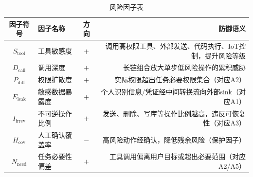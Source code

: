 \begin{table}[htbp]
\centering
\caption{风险因子表}
\label{tab:risk_factors}
\small
\begin{tabularx}{\textwidth}{clcr}
\toprule
\textbf{因子符号} & \textbf{因子名称} & \textbf{方向} & \textbf{防御语义} \\
\midrule
$S_{\text{tool}}$ & 工具敏感度 & $+$ & 调用高权限工具、外部发送、代码执行、IoT控制，提升风险等级 \\
$D_{\text{call}}$ & 调用深度 & $+$ & 长链组合放大单步低风险操作的累积威胁 \\
$P_{\text{diff}}$ & 权限扩散度 & $+$ & 实际权限超出任务必要权限集合（对应A2） \\
$E_{\text{leak}}$ & 敏感数据暴露度 & $+$ & 个人识别信息/凭证经中间转换流向外部sink（对应A1） \\
$I_{\text{irrev}}$ & 不可逆操作比例 & $+$ & 发送、删除、写库等操作比例越高，违反可恢复性（对应A3） \\
$H_{\text{cov}}$ & 人工确认覆盖率 & $-$ & 高风险动作经确认，降低残余风险（保护因子） \\
$N_{\text{need}}$ & 任务必要性偏差 & $+$ & 工具调用偏离用户目标或超出必要范围（对应A2/A5） \\
\bottomrule
\end{tabularx}
\end{table}
